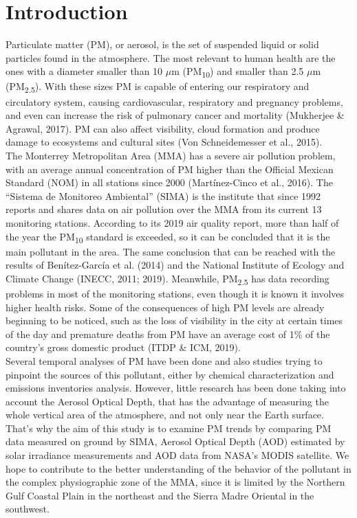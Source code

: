 \section{Introduction}
Particulate matter (PM), or aerosol, is the set of suspended liquid or solid particles found in the atmosphere.
The most relevant to human health are the ones with a diameter smaller than 10 $\mu$m (PM\textsubscript{10})
and smaller than 2.5 $\mu$m (PM\textsubscript{2.5}). With these sizes PM is capable of entering our respiratory
and circulatory system, causing cardiovascular, respiratory and pregnancy problems, and even can increase the
risk of pulmonary cancer and mortality (Mukherjee \& Agrawal, 2017). PM can also affect visibility, cloud formation
and produce damage to ecosystems and cultural sites (Von Schneidemesser et al., 2015).\\

The Monterrey Metropolitan Area (MMA) has a severe air pollution problem, with an average annual concentration
of PM higher than the Official Mexican Standard (NOM) in all stations since 2000 (Martínez-Cinco et al., 2016).
The ``Sistema de Monitoreo Ambiental” (SIMA) is the institute that since 1992 reports and shares data on air
pollution over the MMA from its current 13 monitoring stations. According to its 2019 air quality report, more
than half of the year the PM\textsubscript{10} standard is exceeded, so it can be concluded that it is the
main pollutant in the area. The same conclusion that can be reached with the results of Benítez-García et al. (2014) and the National
Institute of Ecology and Climate Change (INECC, 2011; 2019). Meanwhile, PM\textsubscript{2.5} has data recording problems in most
of the monitoring stations, even though it is known it involves higher health risks. Some of the consequences
of high PM levels are already beginning to be noticed, such as the loss of visibility in the city at certain
times of the day and premature deaths from PM have an average cost of 1\% of the country's gross domestic
product (ITDP \& ICM, 2019).\\

Several temporal analyses of PM have been done and also studies trying to pinpoint the sources of this pollutant,
either by chemical characterization and emissions inventories analysis. However, little research has been done
taking into account the Aerosol Optical Depth, that has the advantage of measuring the whole vertical area of
the atmosphere, and not only near the Earth surface. That’s why the aim of this study is to examine PM trends
by comparing PM data measured on ground by SIMA, Aerosol Optical Depth (AOD) estimated by solar irradiance
measurements and AOD data from NASA’s MODIS satellite. We hope to contribute to the better understanding of
the behavior of the pollutant in the complex physiographic zone of the MMA, since it is limited by the Northern
Gulf Coastal Plain in the northeast and the Sierra Madre Oriental in the southwest.\\

